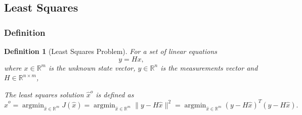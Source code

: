 \documentclass[a4 paper]{article}
\numberwithin{equation}{section}
\DeclareMathOperator*{\argmin}{argmin}
\theoremstyle{boldStyle}
\theoremstyle{boldBlueStyle}
\theoremstyle{boldPurpleStyle}
\theoremstyle{boldRedStyle}
\newtheorem{definition}{Definition}[section]
\theoremstyle{boldGreenStyle}
\newtheorem{example}{Example}[section]
\begin{document}














\newpage
\subsection{Least Squares}

\subsubsection{Definition}

\begin{definition}[Least Squares Problem]
For a set of linear equations
\[
y = Hx,
\]
where \(x \in \mathbb{R}^m\) is the unknown state vector, \( y \in \mathbb{R}^n \) is the 
measurements vector and \( H \in \mathbb{R}^{n \times m} \),

The least squares solution \(\hat{x}^o\) is defined as 
\[
\hat{x}^o = \argmin_{\hat{x} \in \mathbb{R}^m} J(\hat{x}) = \argmin_{\hat{x} \in \mathbb{R}^m} \|y - H\hat{x}\|^2 = 
\argmin_{\hat{x} \in \mathbb{R}^m} (y - H\hat{x})^T (y - H\hat{x}).
\]

\end{definition}
\end{document}
